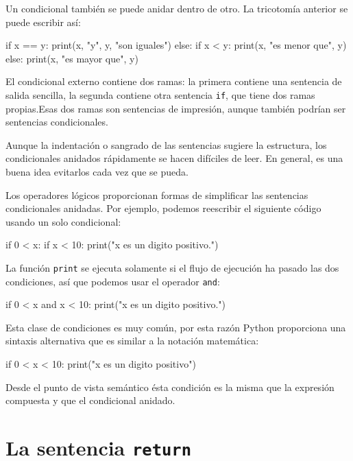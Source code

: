 Un condicional también se puede anidar dentro de otro. La tricotomía
anterior se puede escribir así:

\beforeverb
\begin{pythoncode}
if x == y:
  print(x, "y", y, "son iguales")
else:
  if x < y:
    print(x, "es menor que", y)
  else:
    print(x, "es mayor que", y)
\end{pythoncode}
\afterverb
%

El condicional externo contiene dos ramas: la primera contiene una sentencia de 
salida sencilla, la segunda contiene otra sentencia  \texttt{if}, que tiene dos 
ramas propias.Esas dos ramas son sentencias de impresión, aunque también 
podrían ser sentencias condicionales.

Aunque la indentación o sangrado de las sentencias sugiere la estructura, los 
condicionales anidados rápidamente se hacen difíciles de leer. En general, es 
una buena idea evitarlos cada vez que se pueda.

Los operadores lógicos proporcionan formas de simplificar las sentencias
condicionales anidadas. Por ejemplo, podemos reescribir el siguiente
código usando un solo condicional:

\beforeverb
\begin{pythoncode}
if 0 < x:
  if x < 10:
    print("x es un digito positivo.")
\end{pythoncode}
\afterverb
%

La función \texttt{print} se ejecuta solamente si
el flujo de ejecución ha pasado las dos condiciones, así que
podemos usar el operador \texttt{and}:

\beforeverb
\begin{pythoncode}
if 0 < x and x < 10:
  print("x es un digito positivo.")
\end{pythoncode}
\afterverb
%

Esta clase de condiciones es muy común, por esta razón Python proporciona
una sintaxis alternativa que es similar a la notación matemática:

\beforeverb
\begin{pythoncode}
if 0 < x < 10:
  print("x es un digito positivo")
\end{pythoncode}
\afterverb
%

Desde el punto de vista semántico ésta condición es la misma
que la expresión compuesta y que el condicional anidado.


\section{La  sentencia {\tt return} }

